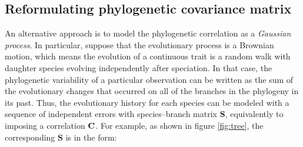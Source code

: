 \documentclass[12pt]{article}
\begin{document}

\subsection{Reformulating phylogenetic covariance matrix}


\newcommand{\bS}{{\mathbf S}}
\newcommand{\bJ}{{\mathbf J}}
\newcommand{\bB}{{\mathbf B}}
\newcommand{\bBadj}{{\mathbf B}_{\mbox{\tiny adj}}}
\newcommand{\bomega}{{\boldsymbol \omega}}
\newcommand{\bell}{{\boldsymbol \ell}}
\newcommand{\e}{{ \epsilon}}

An alternative approach is to model the phylogenetic correlation as a \textit{Gaussian process}. 
In particular, suppose that the evolutionary process is a Brownian motion, which means the evolution of a continuous trait is a random walk with daughter species evolving independently after speciation.  
In that case, the phylogenetic variability of a particular observation can be written as the sum of the evolutionary changes that occurred on all of the branches in the phylogeny in its past. 
Thus, the evolutionary history for each species can be modeled with a sequence of independent errors with species--branch matrix $\bS$, equivalently to imposing a correlation ${\mathbf C}$.
For example, as shown in figure \ref{fig:tree}, the corresponding $\bS$ is in the form:
\end{document}
